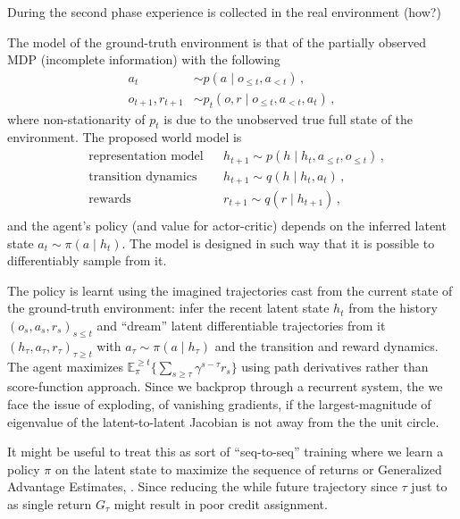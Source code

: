 \documentclass{article}
\begin{document}
During the second phase experience is collected in the real environment (how?)

The model of the ground-truth environment is that of the partially observed MDP (incomplete
information) with the following
\begin{align*}
  a_t & \sim p(a \mid o_{\leq t}, a_{< t})
    \,, \\
  o_{t+1}, r_{t+1}
    & \sim p_t(o, r \mid o_{\leq t}, a_{< t}, a_t)
    \,,
\end{align*}
where non-stationarity of $p_t$ is due to the unobserved true full state of the environment.
% 
The proposed world model is
\begin{equation*}
  \begin{aligned}
    & \text{representation model}
      & & h_{t+1} \sim p(h \mid h_t, a_{\leq t}, o_{\leq t})
          \,, \\
    & \text{transition dynamics}
      & & h_{t+1} \sim q(h \mid h_t, a_t)
          \,, \\
    & \text{rewards}
      & & r_{t+1} \sim q(r \mid h_{t+1})
          \,, \\
  \end{aligned}
\end{equation*}
and the agent's policy (and value for actor-critic) depends on the inferred latent state $
  a_t \sim \pi(a\mid h_t)
$. The model is designed in such way that it is possible to differentiably sample from it.

The policy is learnt using the imagined trajectories cast from the current state of the 
ground-truth environment: infer the recent latent state $h_t$ from the history $
  (o_s, a_s, r_s)_{s \leq t}
$ and ``dream'' latent differentiable trajectories from it $
  (h_\tau, a_\tau, r_\tau)_{\tau \geq t}
$ with $a_\tau \sim \pi(a\mid h_\tau)$ and the transition and reward dynamics. The agent
maximizes $
  \mathbb{E}_{\pi}^{\geq t} \bigl\{
      \sum_{s \geq \tau} \gamma^{s - \tau} r_s
    \bigr\}
$ using path derivatives rather than score-function approach.
% 
Since we backprop through a recurrent system, the we face the issue of exploding, of
vanishing gradients, if the largest-magnitude of eigenvalue of the latent-to-latent
Jacobian is not away from the the unit circle.

It might be useful to treat this as sort of ``seq-to-seq'' training where we learn
a policy $\pi$ on the latent state to maximize the sequence of returns or Generalized
Advantage Estimates, \citep{schulman_high-dimensional_2016}. Since reducing the while
future trajectory since $\tau$ just to as single return $G_\tau$ might result in poor
credit assignment.
\end{document}
